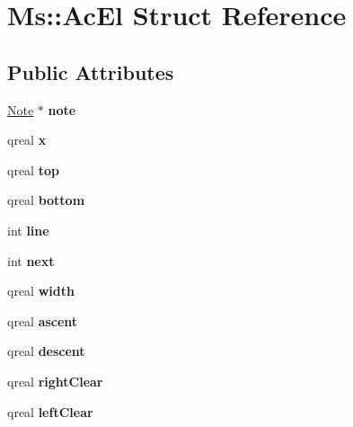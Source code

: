 \hypertarget{struct_ms_1_1_ac_el}{}\section{Ms\+:\+:Ac\+El Struct Reference}
\label{struct_ms_1_1_ac_el}
\subsection*{Public Attributes}
\begin{DoxyCompactItemize}
\item 
\mbox{\label{struct_ms_1_1_ac_el_af0d82c4a09a3e996e4c753bc573c203b}} 
\hyperlink{class_ms_1_1_note}{Note} $\ast$ {\bfseries note}
\item 
\mbox{\label{struct_ms_1_1_ac_el_a61d26cddad28aec211df72ceb32c19dd}} 
qreal {\bfseries x}
\item 
\mbox{\label{struct_ms_1_1_ac_el_af7baa06eeece60df0ae776b5256b2a56}} 
qreal {\bfseries top}
\item 
\mbox{\label{struct_ms_1_1_ac_el_ae697d5ba89d7fd287571f18216914f60}} 
qreal {\bfseries bottom}
\item 
\mbox{\label{struct_ms_1_1_ac_el_af26552704e561432d3acf360f729bf55}} 
int {\bfseries line}
\item 
\mbox{\label{struct_ms_1_1_ac_el_a567a45827d8c039061ba10ecbccbfe2c}} 
int {\bfseries next}
\item 
\mbox{\label{struct_ms_1_1_ac_el_a6bf4c99f6a10905a3d2c97ff0c77174d}} 
qreal {\bfseries width}
\item 
\mbox{\label{struct_ms_1_1_ac_el_ae9a46df565fa3ece18f101bd3afdb9d2}} 
qreal {\bfseries ascent}
\item 
\mbox{\label{struct_ms_1_1_ac_el_abb1a21e5e71cfac9a4591d006ec66462}} 
qreal {\bfseries descent}
\item 
\mbox{\label{struct_ms_1_1_ac_el_a23eaeae4e0e71fa56cf38ef5f8847310}} 
qreal {\bfseries right\+Clear}
\item 
\mbox{\label{struct_ms_1_1_ac_el_a068df0bd57e559772d9689106088771d}} 
qreal {\bfseries left\+Clear}
\end{DoxyCompactItemize}


